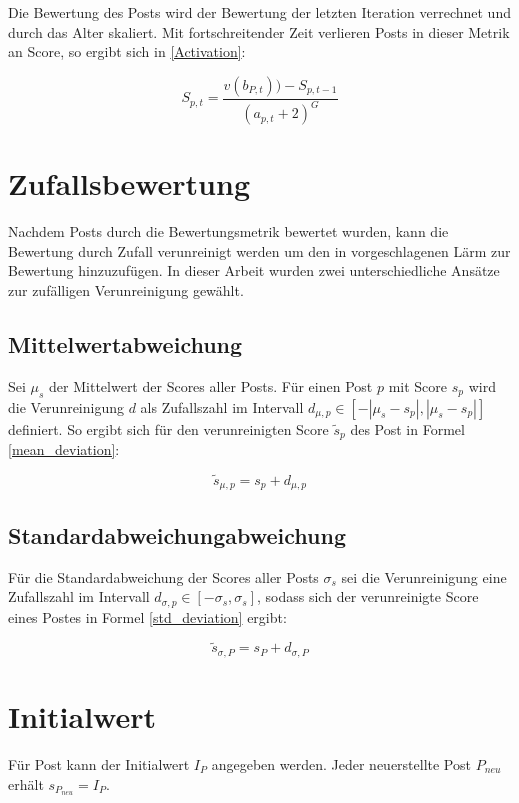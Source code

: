 Die Bewertung des Posts wird der Bewertung der letzten Iteration verrechnet und durch das Alter skaliert. Mit fortschreitender Zeit verlieren Posts in dieser Metrik an Score, so ergibt sich in \ref{Activation}:

\begin{equation}
\label{Activation}
S_{p,t} = \frac{v(b_{P,t})) - S_{p,t-1}}{(a_{p,t} + 2)^{G}}
\end{equation}


\section{Zufallsbewertung}

Nachdem Posts durch die Bewertungsmetrik bewertet wurden, kann die Bewertung durch Zufall verunreinigt werden um den in \cite{Luu} vorgeschlagenen Lärm zur Bewertung hinzuzufügen. In dieser Arbeit wurden zwei unterschiedliche Ansätze zur zufälligen Verunreinigung gewählt.

\subsection{Mittelwertabweichung}

Sei $\mu_s$ der Mittelwert der Scores aller Posts. Für einen Post $p$ mit Score $s_p$ wird die Verunreinigung $d$ als Zufallszahl im Intervall $d_{\mu,p} \in [-|\mu_s - s_p|,|\mu_s - s_p|]$ definiert. So ergibt sich für den verunreinigten Score $\tilde{s}_p$ des Post in Formel \ref{mean_deviation}:

\begin{equation}
\label{mean_deviation}
\tilde{s}_{\mu,p} =  s_p + d_{\mu,p}
\end{equation} 

\subsection{Standardabweichungabweichung}

Für die Standardabweichung der Scores aller Posts $\sigma_s$ sei die Verunreinigung eine Zufallszahl im Intervall $d_{\sigma,p} \in [-\sigma_s,\sigma_s]$, sodass sich der verunreinigte Score eines Postes in Formel \ref{std_deviation} ergibt:

\begin{equation}
\label{std_deviation}
\tilde{s}_{\sigma,P} = s_P + d_{\sigma,P}
\end{equation}

\section{Initialwert}

Für Post kann der Initialwert $I_P$ angegeben werden. Jeder neuerstellte Post $P_{neu}$ erhält $s_{P_{neu}} = I_P$.





	
